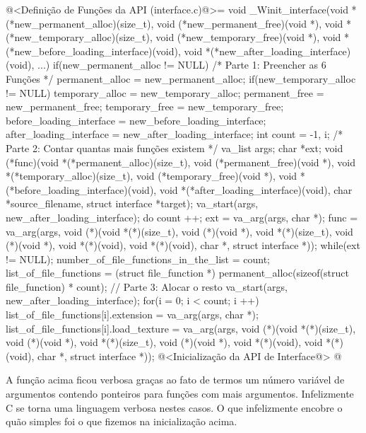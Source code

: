 \iniciocodigo
@<Definição de Funções da API (interface.c)@>=
void _Winit_interface(void *(*new_permanent_alloc)(size_t),
                      void (*new_permanent_free)(void *),
                      void *(*new_temporary_alloc)(size_t),
                      void (*new_temporary_free)(void *),
                      void *(*new_before_loading_interface)(void),
                      void *(*new_after_loading_interface)(void), ...){
  if(new_permanent_alloc != NULL) /* Parte 1: Preencher as 6 Funções */
    permanent_alloc = new_permanent_alloc;
  if(new_temporary_alloc != NULL)
    temporary_alloc = new_temporary_alloc;
  permanent_free = new_permanent_free;
  temporary_free = new_temporary_free;
  before_loading_interface = new_before_loading_interface;
  after_loading_interface = new_after_loading_interface;
  {
    int count = -1, i; /* Parte 2: Contar quantas mais funções existem */
    va_list args;
    char *ext;
    void (*func)(void *(*permanent_alloc)(size_t),
                 void (*permanent_free)(void *), void *(*temporary_alloc)(size_t),
                 void (*temporary_free)(void *),
                 void *(*before_loading_interface)(void),
                 void *(*after_loading_interface)(void),
                 char *source_filename, struct interface *target);
    va_start(args, new_after_loading_interface);
    do{
      count ++;
      ext = va_arg(args, char *);
      func = va_arg(args, void (*)(void *(*)(size_t), void (*)(void *),
                                   void *(*)(size_t), void (*)(void *),
                                   void *(*)(void), void *(*)(void),
                                   char *, struct interface *)); 
    } while(ext != NULL);
    number_of_file_functions_in_the_list = count;
    list_of_file_functions = (struct file_function *)
                               permanent_alloc(sizeof(struct file_function) * 
                                               count); // Parte 3: Alocar o resto
    va_start(args, new_after_loading_interface);
    for(i = 0; i < count; i ++){
      list_of_file_functions[i].extension = va_arg(args, char *);
      list_of_file_functions[i].load_texture =
             va_arg(args, void (*)(void *(*)(size_t), void (*)(void *),
                                   void *(*)(size_t), void (*)(void *),
                                   void *(*)(void), void *(*)(void),
                                   char *, struct interface *));
    }
  }
  @<Inicialização da API de Interface@>
}
@
\fimcodigo

A função acima ficou verbosa graças ao fato de termos um número
variável de argumentos contendo ponteiros para funções com mais
argumentos. Infelizmente C se torna uma linguagem verbosa nestes
casos. O que infelizmente encobre o quão simples foi o que fizemos na
inicialização acima.

